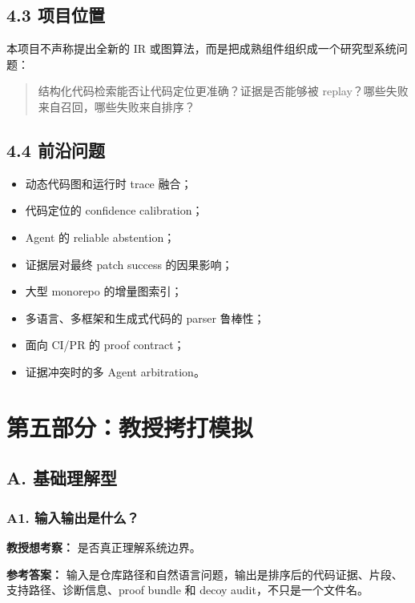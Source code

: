 \documentclass[UTF8,12pt,openany]{ctexbook}
\begin{document}
\section{4.3 项目位置}

本项目不声称提出全新的 IR 或图算法，而是把成熟组件组织成一个研究型系统问题：\par

\begin{quote}
结构化代码检索能否让代码定位更准确？证据是否能够被 replay？哪些失败来自召回，哪些失败来自排序？
\end{quote}

\section{4.4 前沿问题}

\begin{itemize}
\item 动态代码图和运行时 trace 融合；
\item 代码定位的 confidence calibration；
\item Agent 的 reliable abstention；
\item 证据层对最终 patch success 的因果影响；
\item 大型 monorepo 的增量图索引；
\item 多语言、多框架和生成式代码的 parser 鲁棒性；
\item 面向 CI/PR 的 proof contract；
\item 证据冲突时的多 Agent arbitration。
\end{itemize}

\clearpage
\chapter{第五部分：教授拷打模拟}

\section{A. 基础理解型}

\subsection{A1. 输入输出是什么？}

\textbf{教授想考察：} 是否真正理解系统边界。\par

\textbf{参考答案：} 输入是仓库路径和自然语言问题，输出是排序后的代码证据、片段、支持路径、诊断信息、proof bundle 和 decoy audit，不只是一个文件名。\par
\end{document}
